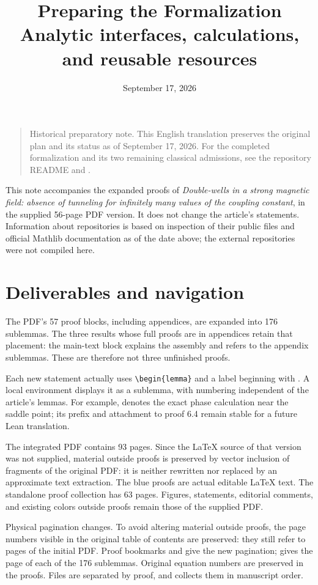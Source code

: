 \documentclass[11pt,a4paper]{article}
\title{Preparing the Formalization\\\large Analytic interfaces, calculations, and reusable resources}
\author{}
\date{September 17, 2026}
\newcommand{\code}[1]{\texttt{\detokenize{#1}}}
\begin{document}
\maketitle
\begin{quote}\small
Historical preparatory note. This English translation preserves the original
plan and its status as of September 17, 2026. For the completed formalization
and its two remaining classical admissions, see the repository README and
.
\end{quote}
This note accompanies the expanded proofs of \emph{Double-wells in a strong
magnetic field: absence of tunneling for infinitely many values of the coupling
constant}, in the supplied 56-page PDF version. It does not change the article's
statements. Information about repositories is based on inspection of their
public files and official Mathlib documentation as of the date above; the
external repositories were not compiled here.

\section{Deliverables and navigation}
The PDF's 57 proof blocks, including appendices, are expanded into 176
sublemmas. The three results whose full proofs are in appendices retain that
placement: the main-text block explains the assembly and refers to the appendix
sublemmas. These are therefore not three unfinished proofs.

Each new statement actually uses \verb|\begin{lemma}| and a label beginning
with \code{sublemma:}. A local environment displays it as a sublemma, with
numbering independent of the article's lemmas. For example,
 denotes the exact phase calculation near
the saddle point; its prefix and attachment to proof 6.4 remain stable for a
future Lean translation.

The integrated PDF contains 93 pages. Since the \LaTeX{} source of that version
was not supplied, material outside proofs is preserved by vector inclusion of
fragments of the original PDF: it is neither rewritten nor replaced by an
approximate text extraction. The blue proofs are actual editable \LaTeX{} text.
The standalone proof collection has 63 pages. Figures, statements, editorial
comments, and existing colors outside proofs remain those of the supplied PDF.

Physical pagination changes. To avoid altering material outside proofs, the
page numbers visible in the original table of contents are preserved: they
still refer to pages of the initial PDF. Proof bookmarks and
 give the new pagination;
 gives the page of each of the 176 sublemmas.
Original equation numbers are preserved in the proofs. Files
 are separated by proof, and 
collects them in manuscript order.
\end{document}
